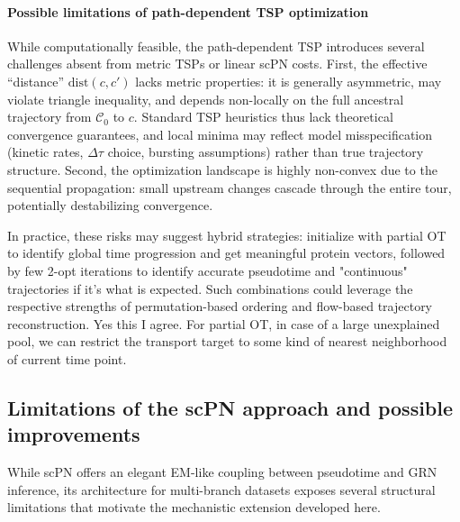 \documentclass[10pt]{article}
\newcommand{\wz}{\color{blue}}
\begin{document}
\paragraph{Possible limitations of path-dependent TSP optimization}

While computationally feasible, the path-dependent TSP introduces several challenges absent from metric TSPs or linear scPN costs. First, the effective ``distance'' $\mathrm{dist}(c,c')$ lacks metric properties: it is generally asymmetric, may violate triangle inequality, and depends non-locally on the full ancestral trajectory from $\mathcal{C}_0$ to $c$. Standard TSP heuristics thus lack theoretical convergence guarantees, and local minima may reflect model misspecification (kinetic rates, $\Delta\tau$ choice, bursting assumptions) rather than true trajectory structure. Second, the optimization landscape is highly non-convex due to the sequential propagation: small upstream changes cascade through the entire tour, potentially destabilizing convergence. 

In practice, these risks may suggest hybrid strategies: initialize with partial OT to identify global time progression and get meaningful protein vectors, followed by few 2-opt iterations to identify accurate pseudotime and "continuous" trajectories if it's what is expected. Such combinations could leverage the respective strengths of permutation-based ordering and flow-based trajectory reconstruction.
{\wz Yes this I agree. For partial OT, in case of a large unexplained pool, we can restrict the transport target to some kind of nearest neighborhood of current time point. }


\subsection{Limitations of the scPN approach and possible improvements}

While scPN offers an elegant EM-like coupling between pseudotime and GRN inference,
its architecture for multi-branch datasets exposes several structural limitations that
motivate the mechanistic extension developed here.
\end{document}
